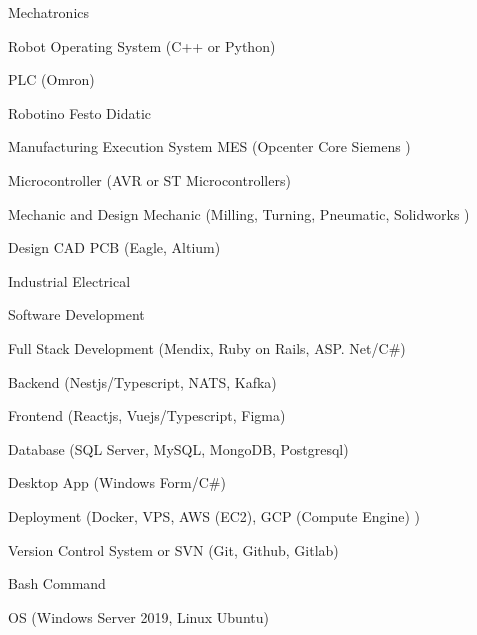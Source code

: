 

\begin{cventries}

  \cventry
  {}
  {Mechatronics}
  {}
  {}
  {
    \begin{cvitems} %
      \item {Robot Operating System (C++ or Python)}
      \item {PLC (Omron)}
      \item {Robotino Festo Didatic}
      \item {Manufacturing Execution System MES (Opcenter Core Siemens )}
      \item {Microcontroller (AVR or ST Microcontrollers)}
      \item {Mechanic and Design Mechanic (Milling, Turning, Pneumatic, Solidworks )}
      \item {Design CAD PCB (Eagle, Altium)}
      \item {Industrial Electrical}
    \end{cvitems}
  }
  
  \cventry
  {}
  {Software Development}
  {}
  {}
  {
    \begin{cvitems} %
      \item {Full Stack Development (Mendix, Ruby on Rails, ASP. Net/C\#)}
      \item {Backend (Nestjs/Typescript, NATS, Kafka)}
      \item {Frontend (Reactjs, Vuejs/Typescript, Figma)}
      \item {Database (SQL Server, MySQL, MongoDB, Postgresql)}
      \item {Desktop App (Windows Form/C\#)}
      \item {Deployment (Docker, VPS, AWS (EC2), GCP (Compute Engine) )}
      \item {Version Control System or SVN (Git, Github, Gitlab)}
      \item {Bash Command}
      \item {OS (Windows Server 2019, Linux Ubuntu)}
    \end{cvitems}
  }
  
\end{cventries}
